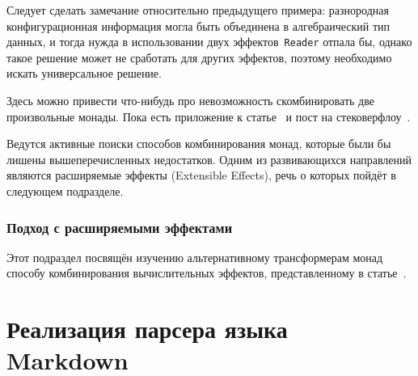 Следует сделать замечание относительно предыдущего примера: разнородная конфигурационная информация могла быть объединена в алгебраический тип данных, и тогда нужда в использовании двух эффектов~\lstinline{Reader} отпала бы, однако такое решение может не сработать для других эффектов, поэтому необходимо искать универсальное решение. 

Здесь можно привести что-нибудь про невозможность скомбинировать две произвольные монады. Пока есть приложение к статье~\autocite{ComposingMonads} и пост на стековерфлоу~\autocite{SOMonadsComposition}.

Ведутся активные поиски способов комбинирования монад, которые были бы лишены вышеперечисленных недостатков. Одним из развивающихся направлений являются расширяемые эффекты (Extensible Effects), речь о которых пойдёт в следующем подразделе.

\subsubsection{Подход с расширяемыми эффектами}

Этот подраздел посвящён изучению альтернативному трансформерам монад способу комбинирования вычислительных эффектов, представленному в статье~\autocite{ExtEffects}. 



\section{Реализация парсера языка Markdown} 

\printbibliography[heading=bibintoc%
]


